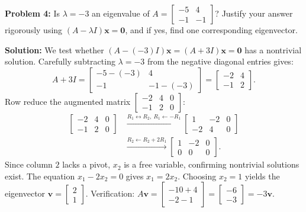 \documentclass[11pt, letterpaper]{article}
\theoremstyle{definition}
\theoremstyle{remark}
\begin{document}
\vspace{0.4em}
\textbf{Problem 4:}
Is $\lambda = -3$ an eigenvalue of $A = \begin{bmatrix} -5 & 4 \\ -1 & -1 \end{bmatrix}$? Justify your answer rigorously using $(A - \lambda I)\mathbf{x} = \mathbf{0}$, and if yes, find one corresponding eigenvector.

\textbf{Solution:}
We test whether $(A - (-3)I)\mathbf{x} = (A + 3I)\mathbf{x} = \mathbf{0}$ has a nontrivial solution. Carefully subtracting $\lambda = -3$ from the negative diagonal entries gives:
\[
A + 3I = \begin{bmatrix} -5 - (-3) & 4 \\ -1 & -1 - (-3) \end{bmatrix} = \begin{bmatrix} -2 & 4 \\ -1 & 2 \end{bmatrix}.
\]
Row reduce the augmented matrix $\begin{bmatrix} -2 & 4 & 0 \\ -1 & 2 & 0 \end{bmatrix}$:
\begin{align*}
\begin{bmatrix} -2 & 4 & 0 \\ -1 & 2 & 0 \end{bmatrix} &\xrightarrow{R_1 \leftrightarrow R_2,\ R_1 \leftarrow -R_1} \begin{bmatrix} 1 & -2 & 0 \\ -2 & 4 & 0 \end{bmatrix} \\
&\xrightarrow{R_2 \leftarrow R_2 + 2R_1} \begin{bmatrix} 1 & -2 & 0 \\ 0 & 0 & 0 \end{bmatrix}.
\end{align*}
Since column $2$ lacks a pivot, $x_2$ is a free variable, confirming nontrivial solutions exist. The equation $x_1 - 2x_2 = 0$ gives $x_1 = 2x_2$. Choosing $x_2 = 1$ yields the eigenvector $\mathbf{v} = \begin{bmatrix} 2 \\ 1 \end{bmatrix}$. Verification: $A\mathbf{v} = \begin{bmatrix} -10 + 4 \\ -2 - 1 \end{bmatrix} = \begin{bmatrix} -6 \\ -3 \end{bmatrix} = -3\mathbf{v}$.
\end{document}
